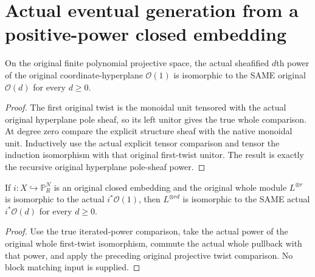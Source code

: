 \section{Actual eventual generation from a positive-power closed embedding}

\begin{lemma}
\label{lem:positive-power-projective-twist}
\leanok
{}
On the original finite polynomial projective space, the actual
sheafified $d$th power of the original coordinate-hyperplane
$\mathcal O(1)$ is isomorphic to the SAME original $\mathcal O(d)$
for every $d\geq0$.
\end{lemma}
\begin{proof}
The first original twist is the monoidal unit tensored with the
actual original hyperplane pole sheaf, so its left unitor gives
the true whole comparison. At degree zero compare the explicit
structure sheaf with the native monoidal unit. Inductively use
the actual explicit tensor comparison and tensor the induction
isomorphism with that original first-twist unitor. The result is
exactly the recursive original hyperplane pole-sheaf power.
\end{proof}

\begin{lemma}
\label{lem:positive-power-projective-block}
\leanok
{}
If $i:X\hookrightarrow\mathbb P^N_R$ is an original closed embedding
and the original whole module $L^{\otimes r}$ is isomorphic to
the actual $i^*\mathcal O(1)$, then $L^{\otimes rd}$ is isomorphic
to the SAME actual $i^*\mathcal O(d)$ for every $d\geq0$.
\end{lemma}
\begin{proof}
Use the true iterated-power comparison, take the actual power
of the original whole first-twist isomorphism, commute the
actual whole pullback with that power, and apply the preceding
original projective twist comparison. No block matching input
is supplied.
\end{proof}

